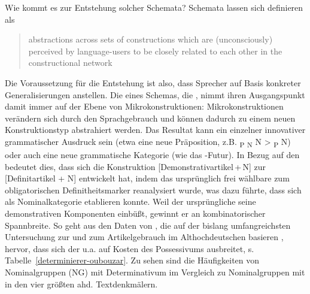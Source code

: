 Wie kommt es zur Entstehung solcher Schemata? Schemata  lassen sich definieren als \blockcquote[14]{Traugott2013}{abstractions across sets of constructions which are (unconsciously) perceived by language-users to be closely related to each other in the constructional network}. Die Voraussetzung für die Entstehung ist also, dass Sprecher auf Basis konkreter  Generalisierungen anstellen. Die  eines Schemas, die  \parencite[116]{Traugott2013}, nimmt ihren Ausgangspunkt damit immer auf der Ebene von Mikrokonstruktionen: Mikrokonstruktionen  verändern sich durch den Sprachgebrauch und können dadurch zu einem neuen Konstruktionstyp abstrahiert werden. Das Resultat kann ein einzelner innovativer grammatischer Ausdruck sein (etwa eine neue Präposition, z.B. \textsubscript{P} \textsubscript{N}  N > \textsubscript{P}  N) oder auch eine neue grammatische Kategorie (wie das -Futur). In Bezug auf den  bedeutet dies, dass sich die Konstruktion   [Demonstrativartikel\,+\,N] zur  [Definitartikel + N] entwickelt hat, indem das ursprünglich frei wählbare  zum obligatorischen Definitheitsmarker  reanalysiert  wurde, 
was dazu führte, dass sich  als Nominalkategorie  etablieren konnte. Weil der ursprüngliche  seine demonstrativen Komponenten einbüßt, gewinnt er an kombinatorischer Spannbreite. So geht aus den Daten von \textcite{Oubouzar1992,Oubouzar1997a}, die auf der bislang umfangreichsten Untersuchung zur  und zum Artikelgebrauch im Althochdeutschen basieren \parencite{Oubouzar1989}, hervor, dass sich der  u.a. auf Kosten des Possessivums  ausbreitet, s. Tabelle~\ref{determinierer-oubouzar}. Zu sehen sind die Häufigkeiten von Nominalgruppen (NG) mit Determinativum  im Vergleich zu Nominalgruppen  mit  in den vier größten ahd. Textdenkmälern. 

